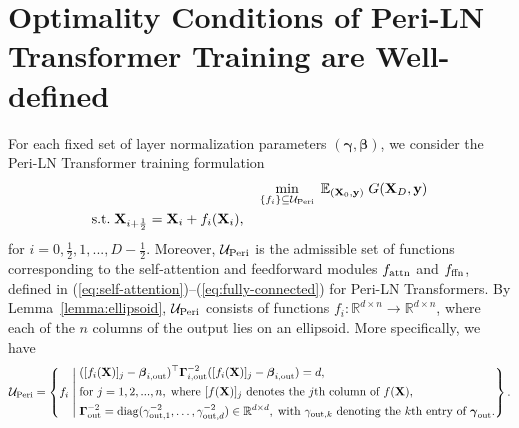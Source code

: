 \documentclass[journal]{IEEEtran}
\newcommand{\bfX}{{\bf X}}
\newcommand{\bfy}{ {\bf y}}
\newcommand{\bfgamma}{{\boldsymbol \gamma}}
\newcommand{\bfGamma}{{\boldsymbol \Gamma}}
\newcommand{\bfbeta}{{\boldsymbol \beta}}
\theoremstyle{plain}
\theoremstyle{definition}
\theoremstyle{remark}
\begin{document}
\section{Optimality Conditions of Peri-LN Transformer Training are Well-defined}
For each fixed set of layer normalization parameters $(\bfgamma, \bfbeta)$, we consider the Peri-LN Transformer training formulation 
\begin{align}\label{eq:PERILN_nonpara_appendix}
    & \min_{\{f_i\} \subseteq \mathcal{U}_{\rm Peri}} \; \mathbb{E}_{(\bfX_0, \bfy)} \; G(\bfX_D, \bfy) \\ 
    \begin{split} &\text{s.t.} \; \bfX_{i+\frac{1}{2}} = \bfX_i + f_i(\bfX_{i}),
\end{split}
\end{align}
for $i=0,\frac{1}{2},1,...,D-\frac{1}{2}$. 
Moreover, $\mathcal{U}_{\rm Peri}$ is the admissible set of functions corresponding to the self-attention and feedforward modules $f_{\rm attn}$ and $f_{\rm ffn}$, defined in (\ref{eq:self-attention})–(\ref{eq:fully-connected}) for Peri-LN Transformers. By Lemma~\ref{lemma:ellipsoid}, $\mathcal{U}_{\rm Peri}$ consists of functions $f_i: \mathbb{R}^{d \times n}  \to \mathbb{R}^{d \times n}$, where each of the $n$ columns of the output lies on an ellipsoid. More specifically, we have
\begin{equation}\label{eq:U_Peri}
    \mathcal{U}_{\rm Peri} = \left\{ f_i \; \middle| \; 
    \begin{aligned}
& ([f_i(\bfX)]_j - \bfbeta_{i, \rm out})^\top \bfGamma_{i, \rm out}^{-2} ([f_i(\bfX)]_j  - \bfbeta_{i, \rm out}) = d,\\
& \text{for } j=1,2,...,n, \; \text{where } [f(\bfX)]_j \text{ denotes the $j$th column of $f(\bfX)$},\\
& \bfGamma_{\rm out}^{-2} = \mathrm{diag}(\gamma_{{\rm out},1}^{-2}, \dots, \gamma_{{\rm out},d}^{-2}) 
  \in \mathbb{R}^{d \times d}, \;\text{with } \gamma_{{\rm out},k} \text{ denoting the $k$th entry of } \bfgamma_{\rm out}.
\end{aligned}
 \right\}.
\end{equation}
\end{document}
